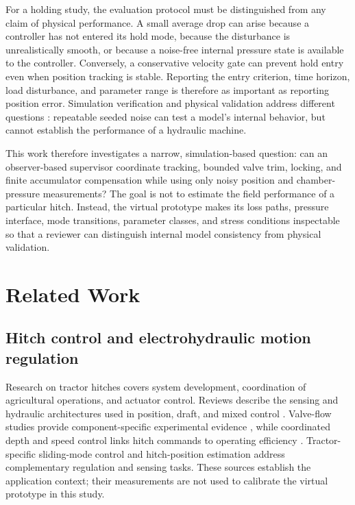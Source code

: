 \documentclass[machines,article,submit,pdftex,moreauthors]{Definitions/mdpi}
\begin{document}
For a holding study, the evaluation protocol must be distinguished from any claim of physical performance. A small average drop can arise because a controller has not entered its hold mode, because the disturbance is unrealistically smooth, or because a noise-free internal pressure state is available to the controller. Conversely, a conservative velocity gate can prevent hold entry even when position tracking is stable. Reporting the entry criterion, time horizon, load disturbance, and parameter range is therefore as important as reporting position error. Simulation verification and physical validation address different questions \cite{sargent2013}: repeatable seeded noise can test a model's internal behavior, but cannot establish the performance of a hydraulic machine.

This work therefore investigates a narrow, simulation-based question: can an observer-based supervisor coordinate tracking, bounded valve trim, locking, and finite accumulator compensation while using only noisy position and chamber-pressure measurements? The goal is not to estimate the field performance of a particular hitch. Instead, the virtual prototype makes its loss paths, pressure interface, mode transitions, parameter classes, and stress conditions inspectable so that a reviewer can distinguish internal model consistency from physical validation.

\section{Related Work}
\subsection{Hitch control and electrohydraulic motion regulation}
Research on tractor hitches covers system development, coordination of agricultural operations, and actuator control. Reviews describe the sensing and hydraulic architectures used in position, draft, and mixed control \cite{sun2022}. Valve-flow studies provide component-specific experimental evidence \cite{kumar2021}, while coordinated depth and speed control links hitch commands to operating efficiency \cite{sun2025}. Tractor-specific sliding-mode control \cite{liu2023} and hitch-position estimation \cite{kim2025} address complementary regulation and sensing tasks. These sources establish the application context; their measurements are not used to calibrate the virtual prototype in this study.
\end{document}
